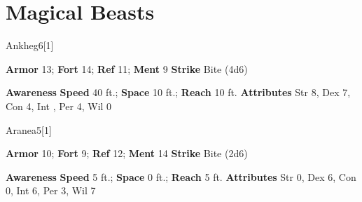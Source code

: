 \section{Magical Beasts}
\begin{monsection}{Ankheg}{6}[1]
\vspace{-1em}\vspace{-1em}
\begin{spellcontent}
\begin{spelltargetinginfo}
\pari \textbf{Armor} 13; \textbf{Fort} 14; \textbf{Ref} 11; \textbf{Ment} 9
\pari \textbf{Strike} Bite  (4d6)
\end{spelltargetinginfo}
\end{spellcontent}
\begin{spellsubcontent}
\begin{spellfooter}
\pari \textbf{Awareness} 
\pari \textbf{Speed} 40 ft.; \textbf{Space} 10 ft.; \textbf{Reach} 10 ft.
\pari \textbf{Attributes} Str 8, Dex 7, Con 4, Int , Per 4, Wil 0
\end{spellfooter}
\end{spellsubcontent}
\end{monsection}
\begin{monsection}{Aranea}{5}[1]
\vspace{-1em}\vspace{-1em}
\begin{spellcontent}
\begin{spelltargetinginfo}
\pari \textbf{Armor} 10; \textbf{Fort} 9; \textbf{Ref} 12; \textbf{Ment} 14
\pari \textbf{Strike} Bite  (2d6)
\end{spelltargetinginfo}
\end{spellcontent}
\begin{spellsubcontent}
\begin{spellfooter}
\pari \textbf{Awareness} 
\pari \textbf{Speed} 5 ft.; \textbf{Space} 0 ft.; \textbf{Reach} 5 ft.
\pari \textbf{Attributes} Str 0, Dex 6, Con 0, Int 6, Per 3, Wil 7
\end{spellfooter}
\end{spellsubcontent}
\end{monsection}
